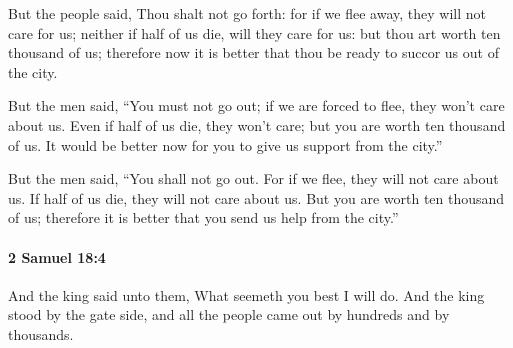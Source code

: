 			\begin{versebox}
					\item[BHS] 
					\item[ASV] But the people said, Thou shalt not go forth: for if we flee away, they will not care for us; neither if half of us die, will they care for us: but thou art worth ten thousand of us; therefore now it is better that thou be ready to succor us out of the city.
					\item[NIV] But the men said, “You must not go out; if we are forced to flee, they won’t care about us. Even if half of us die, they won’t care; but you are worth ten thousand of us. It would be better now for you to give us support from the city.”
					\item[NRSV] But the men said, “You shall not go out. For if we flee, they will not care about us. If half of us die, they will not care about us. But you are worth ten thousand of us; therefore it is better that you send us help from the city.”
			\end{versebox}

		\paragraph{2 Samuel 18:4} %
			\label{2SAMUEL-18-4}

			And the king said unto them, What seemeth you best I will do. And the king stood by the gate side, and all the people came out by hundreds and by thousands.


